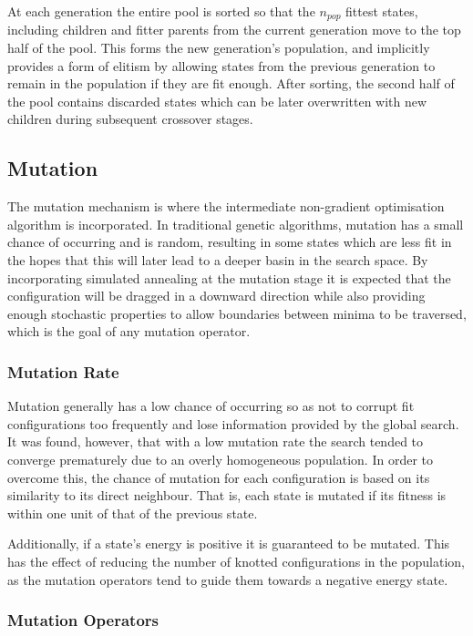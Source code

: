 \documentclass{article}
\begin{document}
At each generation the entire pool is sorted so that the $n_{pop}$ fittest
states, including children and fitter parents from the current generation move
to the top half of the pool. This forms the new generation's population, and
implicitly provides a form of elitism by allowing states from the previous
generation to remain in the population if they are fit enough. After sorting,
the second half of the pool contains discarded states which can be later
overwritten with new children during subsequent crossover stages.

\subsection{Mutation}

The mutation mechanism is where the intermediate non-gradient optimisation
algorithm is incorporated. In traditional genetic algorithms, mutation has
a small chance of occurring and is random, resulting in some states which are
less fit in the hopes that this will later lead to a deeper basin in the search
space. By incorporating simulated annealing at the mutation stage it is expected
that the configuration will be dragged in a downward direction while also
providing enough stochastic properties to allow boundaries between minima to be
traversed, which is the goal of any mutation operator.

\subsubsection{Mutation Rate} \label{mutationrate}

Mutation generally has a low chance of occurring so as not to corrupt fit
configurations too frequently and lose information provided by the global
search. It was found, however, that with a low mutation rate the search tended
to converge prematurely due to an overly homogeneous population. In order to
overcome this, the chance of mutation for each configuration is based on its
similarity to its direct neighbour. That is, each state is mutated if its
fitness is within one unit of that of the previous state.

Additionally, if a state's energy is positive it is guaranteed to be mutated.
This has the effect of reducing the number of knotted configurations in the
population, as the mutation operators tend to guide them towards a negative
energy state.

\subsubsection{Mutation Operators}
\end{document}

